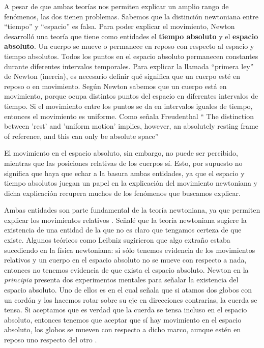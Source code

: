 \documentclass[12pt]{article}
\begin{document}
A pesar de que ambas teorías nos permiten explicar un amplio rango de fenómenos, las dos tienen problemas. Sabemos que la distinción newtoniana entre ``tiempo'' y ``espacio'' es falsa. Para poder explicar el movimiento, Newton desarrolló una teoría que tiene como entidades el \textbf{tiempo absoluto} y el \textbf{espacio absoluto}. Un cuerpo se mueve o permanece en reposo con respecto al espacio y tiempo absolutos. Todos los puntos en el espacio absoluto permanecen constantes durante diferentes intervalos temporales. Para explicar la llamada ``primera ley''  de Newton (inercia), es necesario definir qué significa que un cuerpo esté en reposo o en movimiento. Según Newton sabemos que un cuerpo está en movimiento, porque ocupa distintos puntos del espacio en diferentes intervalos de tiempo. Si el movimiento entre los puntos se da en intervalos iguales de tiempo, entonces el movimiento es uniforme. Como señala Freudenthal `` The distinction between 'rest' and 'uniform motion' implies, however, an absolutely resting frame of reference, and this can only be absolute space'' \citeyear{Freudenthal1986}

El movimiento en el espacio absoluto, sin embargo, no puede ser percibido, mientras que las posiciones relativas de los cuerpos sí. Esto, por supuesto no significa que haya que echar a la basura ambas entidades, ya que el espacio y tiempo absolutos juegan un papel en la explicación del movimiento newtoniana y dicha explicación recupera muchos de los fenómenos que buscamos explicar.

Ambas entidades son parte fundamental de la teoría newtoniana, ya que permiten explicar los movimientos relativos \cite{Maudlin2014Filosofia:7985}. Señalé que la teoría newtoniana sugiere la existencia de una entidad de la que no es claro que tengamos certeza de que existe. Algunos teóricos como Leibniz sugirieron que algo extraño estaba sucediendo en la física newtoniana: si sólo tenemos evidencia de los movimientos relativos y un cuerpo en el espacio absoluto no se mueve con respecto a nada, entonces no tenemos evidencia de que exista el espacio absoluto. Newton en la \textit{principia} presenta dos experimentos mentales para señalar la existencia del espacio absoluto. Uno de ellos es en el cual señala que si atamos dos globos con un cordón y los hacemos rotar sobre su eje en direcciones contrarias, la cuerda se tensa. Si aceptamos que es verdad que la cuerda se tensa incluso en el espacio absoluto, entonces tenemos que aceptar que sí hay movimiento en el espacio absoluto, los globos se mueven con respecto a dicho marco, aunque estén en reposo uno respecto del otro \cite[pp. 6-12]{book:360820}.
\end{document}
